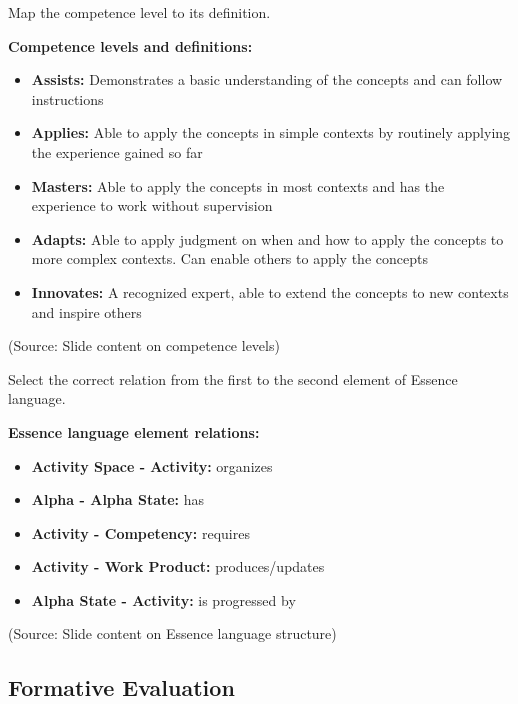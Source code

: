 \documentclass[12pt]{article}
\begin{document}
\begin{questionbox}
Map the competence level to its definition.
\end{questionbox}

\textbf{Competence levels and definitions:}

\begin{itemize}
    \item \textbf{Assists:} Demonstrates a basic understanding of the concepts and can follow instructions
    \item \textbf{Applies:} Able to apply the concepts in simple contexts by routinely applying the experience gained so far
    \item \textbf{Masters:} Able to apply the concepts in most contexts and has the experience to work without supervision
    \item \textbf{Adapts:} Able to apply judgment on when and how to apply the concepts to more complex contexts. Can enable others to apply the concepts
    \item \textbf{Innovates:} A recognized expert, able to extend the concepts to new contexts and inspire others
\end{itemize}

(Source: Slide content on competence levels)

\begin{questionbox}
Select the correct relation from the first to the second element of Essence language.
\end{questionbox}

\textbf{Essence language element relations:}

\begin{itemize}
    \item \textbf{Activity Space - Activity:} organizes
    \item \textbf{Alpha - Alpha State:} has
    \item \textbf{Activity - Competency:} requires
    \item \textbf{Activity - Work Product:} produces/updates
    \item \textbf{Alpha State - Activity:} is progressed by
\end{itemize}

(Source: Slide content on Essence language structure)

\subsection{Formative Evaluation}
\end{document}
